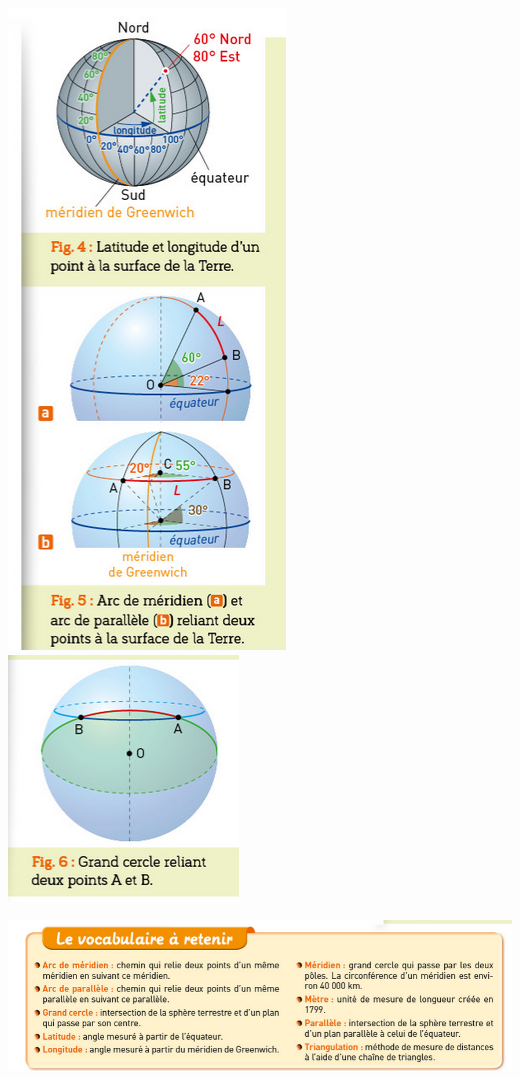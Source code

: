 \documentclass[10pt]{article}
\newcommand{\myscale}{0.55}
\begin{document}
\begin{center}
\begin{minipage}[c]{0.34\textwidth}
		\includegraphics[scale=\myscale]{assets/3i.png}
		\includegraphics[scale=\myscale]{assets/3ii.png}
		\centering
	\end{minipage}


	\includegraphics[scale=\myscale]{assets/voc.png}


\end{center}
\end{document}
